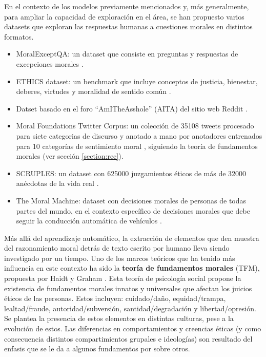 \documentclass[
	spanish, %
	letterpaper, oneside
]{article}
\begin{document}
En el contexto de los modelos previamente mencionados y, más generalmente, para ampliar la capacidad de exploración en el área, se han propuesto varios datasets que exploran las respuestas humanas a cuestiones morales en distintos formatos.

\begin{itemize}
    \item MoralExceptQA: un dataset que consiste en preguntas y respuestas de excepciones morales \cite{Jin}.
    \item ETHICS dataset: un benchmark que incluye conceptos de justicia, bienestar, deberes, virtudes y moralidad de sentido común \cite{Hen}.
    \item Datset basado en el foro ``AmITheAsshole'' (AITA) del sitio web Reddit \cite{aita}.
    \item Moral Foundations Twitter Corpus: un colección de 35108 tweets procesado para siete categorias de discurso y anotado a mano por anotadores entrenados para 10 categorías de sentimiento moral \cite{Hoover}, siguiendo la teoría de fundamentos morales (ver sección \ref{section:rec}).
    \item SCRUPLES: un dataset con 625000 juzgamientos éticos de más de 32000 anécdotas de la vida real \cite{Lourie}.
    \item The Moral Machine: dataset con decisiones morales de personas de todas partes del mundo, en el contexto específico de decisiones morales que debe seguir la conducción automática de vehículos \cite{MM}.
\end{itemize}


\label{section:rec}

Más allá del aprendizaje automático, la extracción de elementos que den muestra del razonamiento moral detrás de texto escrito por humano lleva siendo investigado por un tiempo. Uno de los marcos teóricos que ha tenido más influencia en este contexto ha sido la \textbf{teoría de fundamentos morales} (TFM), propuesta por Haidt y Graham \cite{tmf,tmf2}. Esta teoría de psicología social propone la existencia de fundamentos morales innatos y universales que afectan los juicios éticos de las personas. Estos incluyen: cuidado/daño, equidad/trampa, lealtad/fraude, autoridad/subversión, santidad/degradación y libertad/opresión. Se plantea la presencia de estos elementos en distintas culturas, pese a la evolución de estos. Las diferencias en comportamientos y creencias éticas (y como consecuencia distintos compartimientos grupales e ideologías) son resultado del enfasis que se le da a algunos fundamentos por sobre otros.
\end{document}
